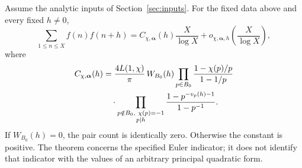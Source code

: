 \begin{theorem}\label{thm:quadratic-indicator-pairs}
Assume the analytic inputs of Section~\ref{sec:inputs}. For the
fixed data above and every fixed \(h\ne0\),
\begin{equation}\label{eq:quadratic-pair-asymptotic}
 \sum_{1\le n\le X}f(n)f(n+h)
       =C_{\chi,\boldsymbol\alpha}(h)\frac X{\log X}
                            +o_{\chi,\boldsymbol\alpha,h}
                                      \left(\frac X{\log X}\right),
\end{equation}
where
\begin{align}
 C_{\chi,\boldsymbol\alpha}(h)
 &=\frac{4L(1,\chi)}\pi\,W_{B_0}(h)
       \prod_{p\in B_0}\frac{1-\chi(p)/p}{1-1/p}\notag\\
 &\quad\cdot
       \prod_{\substack{p\notin B_0,\ \chi(p)=-1\\p\mid h}}
                     \frac{1-p^{-v_p(h)-1}}{1-p^{-1}}.
                                                        \label{eq:quadratic-pair-constant}
\end{align}
If \(W_{B_0}(h)=0\), the pair count is identically zero.
Otherwise the constant is positive. The theorem concerns the
specified Euler indicator; it does not identify that indicator
with the values of an arbitrary principal quadratic form.
\end{theorem}

